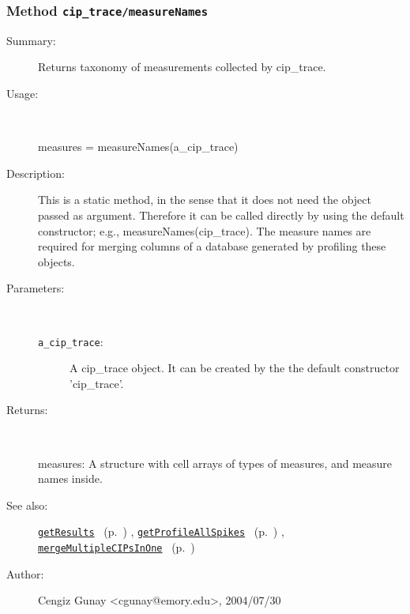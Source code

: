 \subsubsection[Method \texttt{measureNames}]{Method \texttt{cip\_trace/measureNames}}%
%
\label{ref_cip_trace__measureNames}%
\hypertarget{ref_cip_trace__measureNames}{}%
\begin{description}
\item[Summary:]Returns taxonomy of measurements collected by cip\_trace.
%
\item[Usage:]~%
\begin{lyxcode}%
measures = measureNames(a\_cip\_trace)
%
\end{lyxcode}%
%
\item[Description:]%
This is a static method, in the sense that it does not need the object passed as argument.
 Therefore it can be called directly by using the default constructor; e.g., measureNames(cip\_trace).
 The measure names are required for merging columns of a database generated by profiling these objects.
\item[Parameters:]~
\begin{description}%
\item[\texttt{a\_cip\_trace}:]
 A cip\_trace object. It can be created by the the default constructor 'cip\_trace'.
\end{description}%
%
\item[Returns:]~

	measures: A structure with cell arrays of types of measures, and measure names inside.
%
%
\item[See also:]%
\hyperlink{ref_getResults}{\texttt{getResults}}%
\ (p.~\pageref{ref_getResults})%
%
, \hyperlink{ref_getProfileAllSpikes}{\texttt{getProfileAllSpikes}}%
\ (p.~\pageref{ref_getProfileAllSpikes})%
%
, \hyperlink{ref_mergeMultipleCIPsInOne}{\texttt{mergeMultipleCIPsInOne}}%
\ (p.~\pageref{ref_mergeMultipleCIPsInOne})%
%
%
\item[Author:]%
Cengiz Gunay <cgunay@emory.edu>, 2004/07/30%
\end{description}
\methodline%
